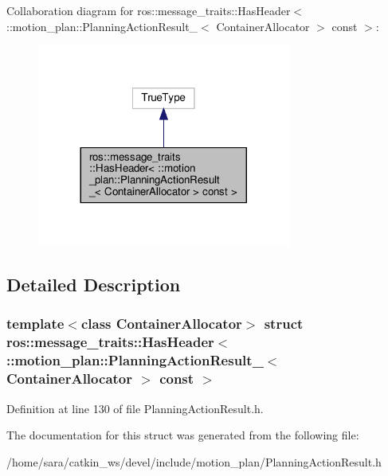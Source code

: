 Collaboration diagram for ros\+:\+:message\+\_\+traits\+:\+:Has\+Header$<$ \+:\+:motion\+\_\+plan\+:\+:Planning\+Action\+Result\+\_\+$<$ Container\+Allocator $>$ const $>$\+:
\nopagebreak
\begin{figure}[H]
\begin{center}
\leavevmode
\includegraphics[width=236pt]{structros_1_1message__traits_1_1HasHeader_3_01_1_1motion__plan_1_1PlanningActionResult___3_01Conb0b33083b640da7aed3656f689be999b}
\end{center}
\end{figure}


\subsection{Detailed Description}
\subsubsection*{template$<$class Container\+Allocator$>$\newline
struct ros\+::message\+\_\+traits\+::\+Has\+Header$<$ \+::motion\+\_\+plan\+::\+Planning\+Action\+Result\+\_\+$<$ Container\+Allocator $>$ const $>$}



Definition at line 130 of file Planning\+Action\+Result.\+h.



The documentation for this struct was generated from the following file\+:\begin{DoxyCompactItemize}
\item 
/home/sara/catkin\+\_\+ws/devel/include/motion\+\_\+plan/Planning\+Action\+Result.\+h\end{DoxyCompactItemize}
